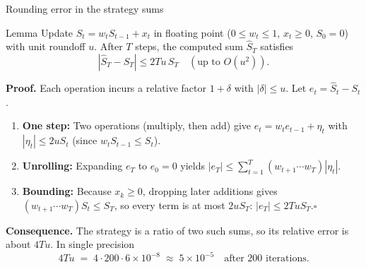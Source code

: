 \documentclass[10pt,aspectratio=169]{beamer}
\newcommand{\tightdisplays}{\setlength\abovedisplayskip{5pt}\setlength\belowdisplayskip{5pt}%
  \setlength\abovedisplayshortskip{2pt}\setlength\belowdisplayshortskip{3pt}}
\begin{document}
\begin{frame}{Rounding error in the strategy sums}
\begin{block}{Lemma}
Update $S_t = w_t S_{t-1} + x_t$ in floating point ($0 \le w_t \le 1$, $x_t \ge 0$, $S_0 = 0$) with unit roundoff $u$. After $T$
steps, the computed sum $\hat{S}_T$ satisfies
\tightdisplays\[ |\hat{S}_T - S_T| \le 2Tu\, S_T \quad (\text{up to } O(u^2)). \]
\end{block}
\pause
\vspace{-7pt}\small
\textbf{Proof.} Each operation incurs a relative factor $1 + \delta$ with $|\delta| \le u$. Let $e_t = \hat{S}_t - S_t$.
\begin{enumerate}\setlength\itemsep{0pt}\setlength\topsep{2pt}
\item \textbf{One step:} Two operations (multiply, then add) give $e_t = w_t e_{t-1} + \eta_t$ with $|\eta_t| \le 2u S_t$ (since
$w_t S_{t-1} \le S_t$).
\item \textbf{Unrolling:} Expanding $e_T$ to $e_0 = 0$ yields $|e_T| \le \sum_{t=1}^T (w_{t+1} \cdots w_T)|\eta_t|$.
\item \textbf{Bounding:} Because $x_k \ge 0$, dropping later additions gives $(w_{t+1} \cdots w_T)S_t \le S_T$, so every term is at
most $2u S_T$: $|e_T| \le 2Tu S_T$.\hfill$\square$
\end{enumerate}

\pause
\vspace{-6pt}
\textbf{Consequence.} The strategy is a ratio of two such sums, so its relative error is about $4Tu$. In single precision
\[ 4Tu \;=\; 4\cdot200\cdot6\times10^{-8} \;\approx\; 5\times10^{-5} \quad\text{after 200 iterations.} \]
\end{frame}
\end{document}
